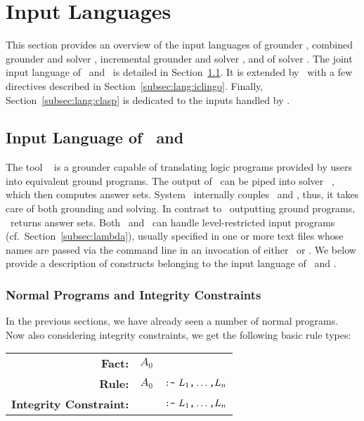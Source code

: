 \section{Input Languages}\label{sec:language}

This section provides an overview of the input languages of
grounder \gringo, combined grounder and solver \clingo,
incremental grounder and solver \iclingo, and of solver \clasp.
The joint input language of \gringo\ and \clingo\ is detailed in
Section~\ref{subsec:lang:gringo}.
It is extended by \iclingo\ with a few directives described in Section~\ref{subsec:lang:iclingo}.
Finally, Section~\ref{subsec:lang:clasp} is dedicated to the inputs
handled by \clasp.


\subsection{Input Language of \gringo\ and \clingo}\label{subsec:lang:gringo}

The tool \gringo~\cite{gescth07a} is a grounder capable of translating
logic programs provided by users into equivalent ground programs.
The output of \gringo\ can be piped into solver \clasp~\cite{gekanesc07b},
which then computes answer sets.
System \clingo\ internally couples \gringo\ and \clasp, thus,
it takes care of both grounding and solving.
In contrast to \gringo\ outputting ground programs, 
\clingo\ returns answer sets.
Both \gringo\ and \clingo\ can handle level-restricted input programs
(cf.\ Section~\ref{subsec:lambda}),
usually specified in one or more text files whose names are passed via the command line
in an invocation of either \gringo\ or \clingo.
We below provide a description of constructs belonging to the input language of \gringo\ and \clingo.


\subsubsection{Normal Programs and Integrity Constraints}\label{subsec:gringo:normal}

In the previous sections, we have already seen a number of normal programs.
Now also considering integrity constraints, we get the following basic rule types:

\begin{tabular}{rl@{}l}
\textbf{Fact:} & $A_0$&\code{.}
\\
\textbf{Rule:} & $A_0$& $\texttt{:-}~L_1\texttt{,}\dots\texttt{,}L_n$\code{.}
\\
\textbf{Integrity Constraint:} & & $\texttt{:-}~L_1\texttt{,}\dots\texttt{,}L_n$\code{.}
\end{tabular}
\\

